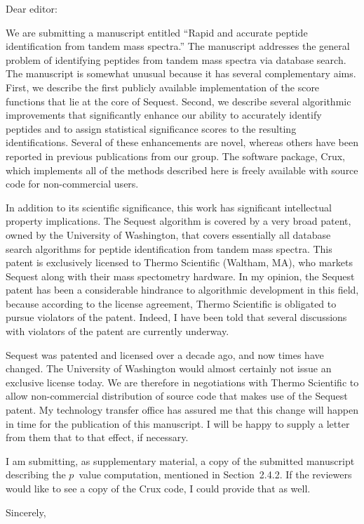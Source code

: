 \documentclass{letter}
\begin{document}
\begin{letter}{}

\opening{Dear editor:}

We are submitting a manuscript entitled ``Rapid and accurate peptide
identification from tandem mass spectra.''  The manuscript addresses
the general problem of identifying peptides from tandem mass spectra
via database search.  The manuscript is somewhat unusual because it
has several complementary aims.  First, we describe the first publicly
available implementation of the score functions that lie at the core
of {\sc Sequest}.  Second, we describe several algorithmic
improvements that significantly enhance our ability to accurately
identify peptides and to assign statistical significance scores to the
resulting identifications.  Several of these enhancements are novel,
whereas others have been reported in previous publications from our
group.  The software package, Crux, which implements all of the
methods described here is freely available with source code for
non-commercial users.

In addition to its scientific significance, this work has significant
intellectual property implications.  The {\sc Sequest} algorithm is
covered by a very broad patent, owned by the University of Washington,
that covers essentially all database search algorithms for peptide
identification from tandem mass spectra.  This patent is exclusively
licensed to Thermo Scientific (Waltham, MA), who markets {\sc Sequest}
along with their mass spectometry hardware.  In my opinion, the {\sc
Sequest} patent has been a considerable hindrance to algorithmic
development in this field, because according to the license agreement,
Thermo Scientific is obligated to pursue violators of the patent.
Indeed, I have been told that several discussions with violators of
the patent are currently underway.

{\sc Sequest} was patented and licensed over a decade ago, and now
times have changed.  The University of Washington would almost
certainly not issue an exclusive license today.  We are therefore in
negotiations with Thermo Scientific to allow non-commercial
distribution of source code that makes use of the {\sc Sequest}
patent.  My technology transfer office has assured me that this change
will happen in time for the publication of this manuscript.  I will be
happy to supply a letter from them that to that effect, if necessary.


I am submitting, as supplementary material, a copy of the submitted
manuscript describing the $p$~value computation, mentioned in
Section~2.4.2.  If the reviewers would like to see a copy of the Crux
code, I could provide that as well.

\closing{Sincerely,}

\end{letter}
\end{document}
